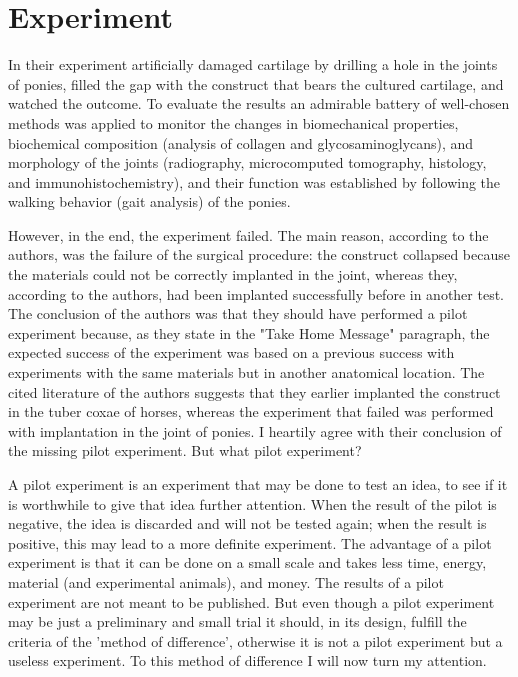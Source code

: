 \documentclass[twocolumn, reflection, authordate, serif, seplic]{jote-article}
\begin{document}
 {}\section*{Experiment} 

In their experiment \textcite{Diloksumpan2021} artificially damaged cartilage by drilling a hole in the joints of ponies, filled the gap with the construct that bears the cultured cartilage, and watched the outcome. To evaluate the results an admirable battery of well-chosen methods was applied to monitor the changes in biomechanical properties, biochemical composition (analysis of collagen and glycosaminoglycans), and morphology of the joints (radiography, microcomputed tomography, histology, and immunohistochemistry), and their function was established by following the walking behavior (gait analysis) of the ponies.

However, in the end, the experiment failed. The main reason, according to the authors, was the failure of the surgical procedure: the construct collapsed because the materials could not be correctly implanted in the joint, whereas they, according to the authors, had been implanted successfully before in another test. The conclusion of the authors was that they should have performed a pilot experiment because, as they state in the "Take Home Message" paragraph, the expected success of the experiment was based on a previous success with experiments with the same materials but in another anatomical location. The cited literature of the authors suggests that they earlier implanted the construct in the tuber coxae of horses, whereas the experiment that failed was performed with implantation in the joint of ponies. I heartily agree with their conclusion of the missing pilot experiment. But what pilot experiment?

A pilot experiment is an experiment that may be done to test an idea, to see if it is worthwhile to give that idea further attention. When the result of the pilot is negative, the idea is discarded and will not be tested again; when the result is positive, this may lead to a more definite experiment. The advantage of a pilot experiment is that it can be done on a small scale and takes less time, energy, material (and experimental animals), and money. The results of a pilot experiment are not meant to be published. But even though a pilot experiment may be just a preliminary and small trial it should, in its design, fulfill the criteria of the 'method of difference', otherwise it is not a pilot experiment but a useless experiment. To this method of difference I will now turn my attention.
\end{document}
